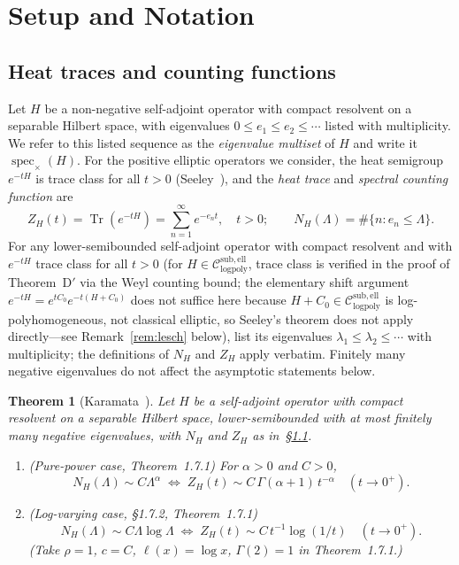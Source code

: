 \documentclass[12pt]{amsart}
\newtheorem{theorem}{Theorem}[section]
\newcommand{\Csub}{\mathcal{C}_{\mathrm{logpoly}}^{\mathrm{sub,ell}}}
\begin{document}
\section{Setup and Notation}
\label{sec:setup}%

\subsection{Heat traces and counting functions}
\label{subsec:heattraces}

Let $H$ be a non-negative self-adjoint operator with compact resolvent
on a separable Hilbert space, with eigenvalues
$0\le e_1\le e_2\le\cdots$ listed with multiplicity.
We refer to this listed sequence as the \emph{eigenvalue multiset}
of $H$ and write it $\operatorname{spec}_{\times}(H)$.
For the positive elliptic operators we consider, the heat semigroup
$e^{-tH}$ is trace class for all $t>0$ (Seeley~\cite{Seeley1967}),
and the \emph{heat trace} and \emph{spectral counting function} are
\[
  Z_H(t)=\operatorname{Tr}(e^{-tH})=\sum_{n=1}^\infty e^{-e_n t},
  \quad t>0; \qquad
  N_H(\Lambda)=\#\{n:e_n\le\Lambda\}.
\]
For any lower-semibounded self-adjoint operator with compact resolvent and with
$e^{-tH}$ trace class for all $t>0$ (for $H\in\Csub$, trace class is verified
in the proof of Theorem~D$'$ via the Weyl counting bound; the elementary shift
argument $e^{-tH}=e^{tC_0}e^{-t(H+C_0)}$ does not suffice here because
$H+C_0\in\Csub$ is log-polyhomogeneous, not classical elliptic, so Seeley's
theorem does not apply directly---see Remark~\ref{rem:lesch} below),
list its eigenvalues $\lambda_1\le\lambda_2\le\cdots$ with multiplicity;
the definitions of $N_H$ and $Z_H$ apply verbatim.
Finitely many negative eigenvalues do not affect the asymptotic statements below.

\begin{theorem}[Karamata~\cite{BGT1987}]
\label{thm:karamata}
Let $H$ be a self-adjoint operator with compact resolvent on a separable
Hilbert space, lower-semibounded with at most finitely many negative
eigenvalues, with $N_H$ and $Z_H$ as in~\S\ref{subsec:heattraces}.
\begin{enumerate}[label=(\roman*)]
\item \emph{(Pure-power case, \cite{BGT1987} Theorem~1.7.1)}
For $\alpha>0$ and $C>0$,
\[
  N_H(\Lambda)\sim C\Lambda^\alpha
  \;\iff\;
  Z_H(t)\sim C\,\Gamma(\alpha+1)\,t^{-\alpha}
  \quad(t\to 0^+).
\]
\item \emph{(Log-varying case, \cite{BGT1987} \S1.7.2, Theorem~1.7.1)}
\[
  N_H(\Lambda)\sim C\Lambda\log\Lambda
  \;\iff\;
  Z_H(t)\sim C\,t^{-1}\log(1/t)
  \quad(t\to 0^+).
\]
(Take $\rho=1$, $c=C$, $\ell(x)=\log x$, $\Gamma(2)=1$ in Theorem~1.7.1.)
\end{enumerate}
\end{theorem}
\end{document}
